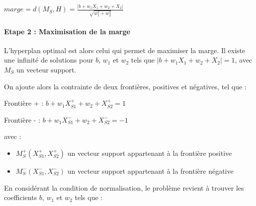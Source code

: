 \documentclass[
]{article}
\providecommand{\tightlist}{%
  \setlength{\itemsep}{0pt}\setlength{\parskip}{0pt}}
\begin{document}
\begin{center}
  $marge=d(M_S,H)=\frac{|b+w_1X_1+w_2+X_2|}{\sqrt{w_1^2+w_2^2}}$
\end{center}

\hypertarget{etape-2-maximisation-de-la-marge}{%
\paragraph{Etape 2 : Maximisation de la
marge}\label{etape-2-maximisation-de-la-marge}}

L'hyperplan optimal est alors celui qui permet de maximiser la marge. Il
existe une infinité de solutions pour \(b\), \(w_1\) et \(w_2\) tels que
\(|b+w_1X_1+w_2+X_2| = 1\), avec \(M_S\) un vecteur support.

On ajoute alors la contrainte de deux frontières, positives et
négatives, tel que :

\begin{center}

Frontière + : $b+w_1X_{S1}^{+}+w_2+X_{S2}^{+}=1$

Frontière - :  $b+w_1X_{S1}^{-}+w_2+X_{S2}^{-}=-1$

\end{center}

avec :

\begin{itemize}
\tightlist
\item
  \(M_S^{+}(X_{S1}^{+},X_{S2}^{+})\) un vecteur support appartenant à la
  frontière positive
\item
  \(M_S^{-}(X_{S1}^{-},X_{S2}^{-})\) un vecteur support appartenant à la
  frontière négative
\end{itemize}

En considérant la condition de normalisation, le problème revient à
trouver les coefficients \(b\), \(w_1\) et \(w_2\) tels que :
\end{document}
